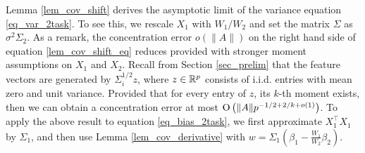 Lemma \ref{lem_cov_shift} derives the asymptotic limit of the variance equation \eqref{eq_var_2task}.
To see this, we rescale $X_1$ with $W_1 / W_2$ and set the matrix $\Sigma$ as $\sigma^2 \Sigma_2$.
As a remark, the concentration error $o(\|A\|)$ on the right hand side of equation \eqref{lem_cov_shift_eq} reduces provided with stronger moment assumptions on $X_1$ and $X_2$. %
Recall from Section \ref{sec_prelim} that the feature vectors are generated by $\Sigma_i^{1/2} z$, where $z\in\mathbb{R}^p$ consists of i.i.d. entries with mean zero and unit variance.
Provided that for every entry of $z$, its $k$-th moment exists, then we can obtain a concentration error at most $\operatorname{O}\left(\|A\| p^{-1/2 + 2/k + o(1)}\right)$.
To apply the above result to equation \eqref{eq_bias_2task}, we first approximate $X_1^{\top}X_1$ by $\Sigma_1$, and then use Lemma \ref{lem_cov_derivative} with $w = \Sigma_1 (\beta_1 - \frac{W_1}{W_2} \beta_2)$.
